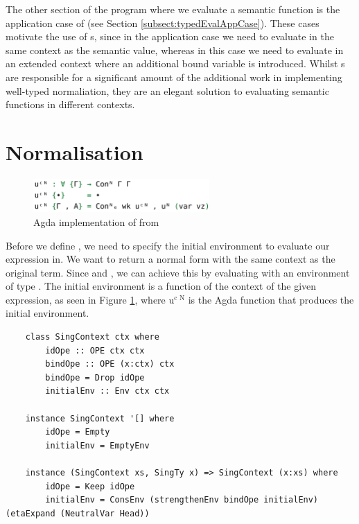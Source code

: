 The other section of the program where we evaluate a semantic function  is the application case of  (see Section \ref{subsect:typedEvalAppCase}). These cases motivate the use of s, since in the application case we need to evaluate  in the same context as the semantic value, whereas in this case we need to evaluate  in an extended context where an additional bound variable is introduced. Whilst s are responsible for a significant amount of the additional work in implementing well-typed normaliation, they are an elegant solution to evaluating semantic functions in different contexts.



\section{Normalisation}

\begin{figure}[h]
    \centering
    \includegraphics[width=0.6\textwidth]{./images/agda_initial_env.png}
    \caption{Agda implementation of  from \cite{AgdaNbe}}
    \label{fig:agdaInitialEnv}
\end{figure}

Before we define , we need to specify the initial environment to evaluate our expression in. We want  to return a normal form with the same context as the original term. Since  and , we can achieve this by evaluating with an environment of type . The initial environment is a function of the context of the given expression, as seen in Figure \ref{fig:agdaInitialEnv}, where $\text{u}^\text{c N}$ is the Agda function that produces the initial environment.

\begin{lstlisting}
    class SingContext ctx where
        idOpe :: OPE ctx ctx
        bindOpe :: OPE (x:ctx) ctx
        bindOpe = Drop idOpe
        initialEnv :: Env ctx ctx

    instance SingContext '[] where
        idOpe = Empty
        initialEnv = EmptyEnv

    instance (SingContext xs, SingTy x) => SingContext (x:xs) where
        idOpe = Keep idOpe
        initialEnv = ConsEnv (strengthenEnv bindOpe initialEnv) (etaExpand (NeutralVar Head))
\end{lstlisting}

